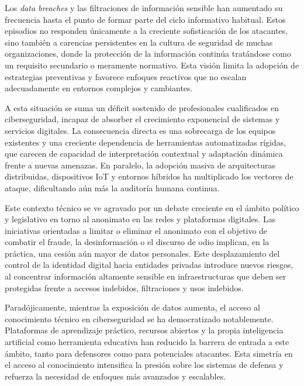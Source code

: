 Los \textit{data breaches} y las filtraciones de información sensible han aumentado su frecuencia \cite{2144753} hasta el punto de formar parte del ciclo informativo habitual. Estos episodios no responden únicamente a la creciente sofisticación de los atacantes, sino también a carencias persistentes en la cultura de seguridad \cite{daveiga2020culture} de muchas organizaciones, donde la protección de la información continúa tratándose como un requisito secundario o meramente normativo. Esta visión limita la adopción de estrategias preventivas y favorece enfoques reactivos que no escalan adecuadamente en entornos complejos y cambiantes.

A esta situación se suma un déficit sostenido de profesionales cualificados en ciberseguridad, incapaz de absorber el crecimiento exponencial de sistemas y servicios digitales. La consecuencia directa es una sobrecarga de los equipos existentes y una creciente dependencia de herramientas automatizadas rígidas, que carecen de capacidad de interpretación contextual y adaptación dinámica frente a nuevas amenazas. En paralelo, la adopción masiva de arquitecturas distribuidas, dispositivos IoT y entornos híbridos ha multiplicado los vectores de ataque, dificultando aún más la auditoría humana continua.

Este contexto técnico se ve agravado por un debate creciente en el ámbito político y legislativo en torno al anonimato en las redes y plataformas digitales. \cite{chawla2024privacy} Las iniciativas orientadas a limitar o eliminar el anonimato con el objetivo de combatir el fraude, la desinformación o el discurso de odio implican, en la práctica, una cesión aún mayor de datos personales. Este desplazamiento del control de la identidad digital hacia entidades privadas introduce nuevos riesgos, al concentrar información altamente sensible en infraestructuras que deben ser protegidas frente a accesos indebidos, filtraciones y usos indebidos.

Paradójicamente, mientras la exposición de datos aumenta, el acceso al conocimiento técnico en ciberseguridad se ha democratizado notablemente. \cite{democratization_cyber_2024} Plataformas de aprendizaje práctico, recursos abiertos y la propia inteligencia artificial como herramienta educativa han reducido la barrera de entrada a este ámbito, tanto para defensores como para potenciales atacantes. Esta simetría en el acceso al conocimiento \cite{ferrara2024symmetry} intensifica la presión sobre los sistemas de defensa y refuerza la necesidad de enfoques más avanzados y escalables.

